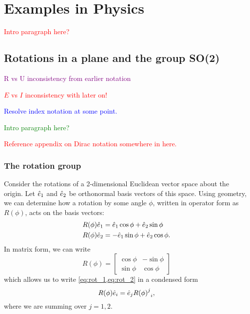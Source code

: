 \chapter{Examples in Physics}\label{ch:Phys_applications}

\textcolor{red}{Intro paragraph here?}

\section{Rotations in a plane and the group SO(2)}
\textcolor{purple}{R vs U inconsistency from earlier notation}

\textcolor{red}{$E$ vs $I$ inconsistency with later on!}

\textcolor{blue}{Resolve index notation at some point.}

\textcolor{green}{Intro paragraph here?}

\textcolor{red}{Reference appendix on Dirac notation somewhere in here.}

\subsection{The rotation group}
Consider the rotations of a 2-dimensional Euclidean vector space about the origin. Let $\hat{e}_1$ and $\hat{e}_2$ be orthonormal basis vectors of this space. Using geometry, we can determine how a rotation by some angle $\phi$, written in operator form as $R(\phi)$, acts on the basis vectors:
    \begin{align}
        R(\phi)\hat{e}_1 &= \hat{e}_1\cos\phi + \hat{e}_2\sin\phi \label{eq:rot_1}\\
        R(\phi)\hat{e}_2 &= -\hat{e}_1\sin\phi + \hat{e}_2\cos\phi.\label{eq:rot_2}
    \end{align}
    In matrix form, we can write
    \begin{equation}
        R(\phi) = 
        \begin{bmatrix}
            \cos\phi & -\sin\phi \\
            \sin\phi & \cos\phi
        \end{bmatrix}
    \end{equation}
    which allows us to write \cref{eq:rot_1,eq:rot_2} in a condensed form
    \begin{equation}
        R(\phi)\hat{e}_i = \hat{e}_j{{R(\phi)}^j}_i,
    \end{equation}
    where we are summing over $j=1,2$.

